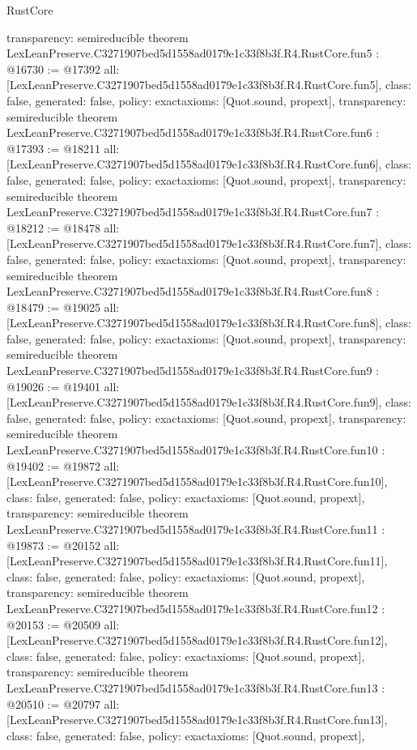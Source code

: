 \begin{lexlean}{RustCore}
\begin{coremodule}
{  transparency: semireducible
}
theorem LexLeanPreserve.C3271907bed5d1558ad0179e1c33f8b3f.R4.RustCore.fun5 : @16730 := @17392 {
  all: [LexLeanPreserve.C3271907bed5d1558ad0179e1c33f8b3f.R4.RustCore.fun5],
  class: false,
  generated: false,
  policy: exact{axioms: [Quot.sound, propext]},
  transparency: semireducible
}
theorem LexLeanPreserve.C3271907bed5d1558ad0179e1c33f8b3f.R4.RustCore.fun6 : @17393 := @18211 {
  all: [LexLeanPreserve.C3271907bed5d1558ad0179e1c33f8b3f.R4.RustCore.fun6],
  class: false,
  generated: false,
  policy: exact{axioms: [Quot.sound, propext]},
  transparency: semireducible
}
theorem LexLeanPreserve.C3271907bed5d1558ad0179e1c33f8b3f.R4.RustCore.fun7 : @18212 := @18478 {
  all: [LexLeanPreserve.C3271907bed5d1558ad0179e1c33f8b3f.R4.RustCore.fun7],
  class: false,
  generated: false,
  policy: exact{axioms: [Quot.sound, propext]},
  transparency: semireducible
}
theorem LexLeanPreserve.C3271907bed5d1558ad0179e1c33f8b3f.R4.RustCore.fun8 : @18479 := @19025 {
  all: [LexLeanPreserve.C3271907bed5d1558ad0179e1c33f8b3f.R4.RustCore.fun8],
  class: false,
  generated: false,
  policy: exact{axioms: [Quot.sound, propext]},
  transparency: semireducible
}
theorem LexLeanPreserve.C3271907bed5d1558ad0179e1c33f8b3f.R4.RustCore.fun9 : @19026 := @19401 {
  all: [LexLeanPreserve.C3271907bed5d1558ad0179e1c33f8b3f.R4.RustCore.fun9],
  class: false,
  generated: false,
  policy: exact{axioms: [Quot.sound, propext]},
  transparency: semireducible
}
theorem LexLeanPreserve.C3271907bed5d1558ad0179e1c33f8b3f.R4.RustCore.fun10 : @19402 := @19872 {
  all: [LexLeanPreserve.C3271907bed5d1558ad0179e1c33f8b3f.R4.RustCore.fun10],
  class: false,
  generated: false,
  policy: exact{axioms: [Quot.sound, propext]},
  transparency: semireducible
}
theorem LexLeanPreserve.C3271907bed5d1558ad0179e1c33f8b3f.R4.RustCore.fun11 : @19873 := @20152 {
  all: [LexLeanPreserve.C3271907bed5d1558ad0179e1c33f8b3f.R4.RustCore.fun11],
  class: false,
  generated: false,
  policy: exact{axioms: [Quot.sound, propext]},
  transparency: semireducible
}
theorem LexLeanPreserve.C3271907bed5d1558ad0179e1c33f8b3f.R4.RustCore.fun12 : @20153 := @20509 {
  all: [LexLeanPreserve.C3271907bed5d1558ad0179e1c33f8b3f.R4.RustCore.fun12],
  class: false,
  generated: false,
  policy: exact{axioms: [Quot.sound, propext]},
  transparency: semireducible
}
theorem LexLeanPreserve.C3271907bed5d1558ad0179e1c33f8b3f.R4.RustCore.fun13 : @20510 := @20797 {
  all: [LexLeanPreserve.C3271907bed5d1558ad0179e1c33f8b3f.R4.RustCore.fun13],
  class: false,
  generated: false,
  policy: exact{axioms: [Quot.sound, propext]},
}
\end{coremodule}
\end{lexlean}
